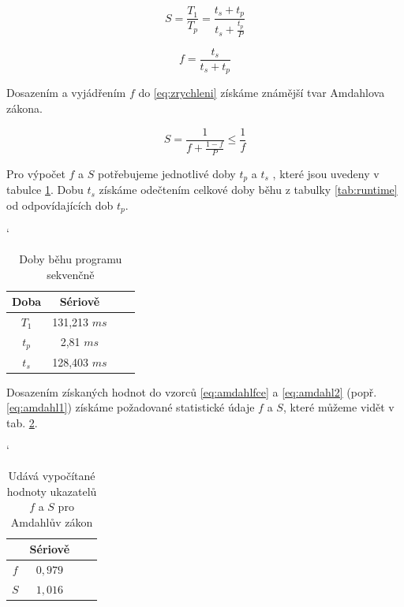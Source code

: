 \documentclass{article}
\begin{document}
	\begin{equation} 
	S=\frac{T_{1}}{T_{p}} = \frac{t_{s} + t_{p} }{t_{s} + \frac{t_{p}}{P}}
	\label{eq:amdahl1}
	\end{equation}
	
	
	\begin{equation} 
	f = \frac{t_{s}}{t_{s} + t_{p}}
	\label{eq:amdahlfce}
	\end{equation}
	
	Dosazením a vyjádřením $f$ do \ref{eq:zrychleni} získáme známější tvar Amdahlova zákona.
	
	\begin{equation} 
	S=\frac{1}{f + \frac{1-f}{P}} \leq  \frac{1}{f}
	\label{eq:amdahl2}
	\end{equation}
	
	Pro výpočet $f$ a $S$ potřebujeme jednotlivé doby $t_{p}$ a $t_{s}$ , které jsou uvedeny v tabulce \ref{tab:dobyBeh2}. Dobu $t_{s}$ získáme odečtením celkové doby běhu z tabulky \ref{tab:runtime} od odpovídajících dob $t_{p}$.
	
	
	\begin{table}[h]
	\centering
	\catcode`
	\def\arraystretch{1.2}
	\begin{tabular}{|c|c|c|c|}
	\hline
	\textbf{Doba}   & \textbf{Sériově} \\ \hline
	\hline
	$T_{1}$    		  & 131,213 $m s$ \\ \hline
	$t_{p}$                  & 2,81 $m s$  \\ \hline
	$t_{s}$           		  & 128,403 $m s$ \\ \hline
	\end{tabular}
	\caption{Doby běhu programu sekvenčně}
	\label{tab:dobyBeh2}
	\end{table}
	
	Dosazením získaných hodnot do vzorců \ref{eq:amdahlfce} a \ref{eq:amdahl2} (popř. \ref{eq:amdahl1}) získáme požadované statistické údaje $f$ a $S$, které můžeme vidět v tab. \ref{tab:amdahlFinal}.
	
	\begin{table}[h]
	\centering
	\catcode`
	\def\arraystretch{1.2}
	\begin{tabular}{|c|c|c|c|}
	\hline
	\textbf{}   & \textbf{Sériově} \\ \hline
	\hline
	$f$    		  & $0,979$\\ \hline
	$S$                  &  $1,016$\\ \hline
	\end{tabular}
	\caption{Udává vypočítané hodnoty ukazatelů $f$ a $S$ pro Amdahlův zákon}
	\label{tab:amdahlFinal}
	\end{table}
	
\end{document}
